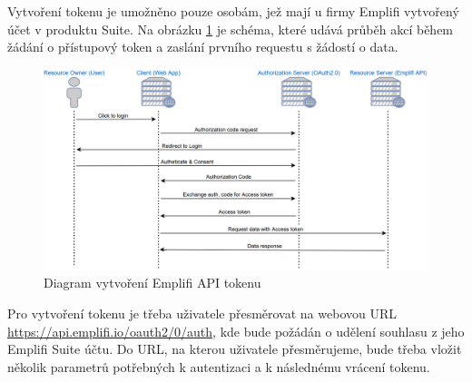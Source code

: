 \documentclass[czech, bc, kiv, he, iso690numb]{fasthesis}
\begin{document}
Vytvoření tokenu je umožněno pouze osobám, jež mají u firmy Emplifi vytvořený účet v produktu Suite. Na obrázku \ref{fig:emplifAPIDiagram} je schéma, které udává průběh akcí během žádání o 
přístupový token a zaslání prvního requestu s žádostí o data.
\begin{figure}
	\centering
	\includegraphics[width=1\textwidth]{pictures/emplifiAPI.png}
	\caption{Diagram vytvoření Emplifi API tokenu \cite{emplifiDocs}}
	\label{fig:emplifAPIDiagram}
\end{figure}

Pro vytvoření tokenu je třeba uživatele přesměrovat na webovou URL \url{https://api.emplifi.io/oauth2/0/auth}, kde bude požádán o udělení souhlasu z jeho Emplifi Suite účtu.
Do URL, na kterou uživatele přesměrujeme, bude třeba vložit několik parametrů potřebných k autentizaci a k následnému vrácení tokenu. 
\end{document}

